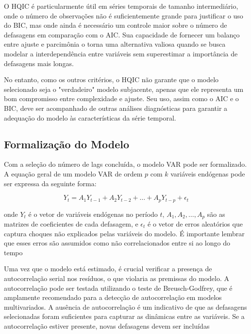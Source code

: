 \documentclass[12pt,oneside,a4paper,chapter=TITLE,english,brazil,sumario=abnt-6027-2012]{abntex2}
\begin{document}
O HQIC é particularmente útil em séries temporais de tamanho intermediário, onde o número de observações não é suficientemente grande para justificar o uso do BIC, mas onde ainda é necessário um controle maior sobre o número de defasagens em comparação com o AIC. Sua capacidade de fornecer um balanço entre ajuste e parcimônia o torna uma alternativa valiosa quando se busca modelar a interdependência entre variáveis sem superestimar a importância de defasagens mais longas.

No entanto, como os outros critérios, o HQIC não garante que o modelo selecionado seja o "verdadeiro" modelo subjacente, apenas que ele representa um bom compromisso entre complexidade e ajuste. Seu uso, assim como o AIC e o BIC, deve ser acompanhado de outras análises diagnósticas para garantir a adequação do modelo às características da série temporal.



\subsection{Formalização do Modelo}

Com a seleção do número de lags concluída, o modelo VAR pode ser formalizado. A equação geral de um modelo VAR de ordem \( p \) com \( k \) variáveis endógenas pode ser expressa da seguinte forma:

\[
	Y_t = A_1 Y_{t-1} + A_2 Y_{t-2} + \dots + A_p Y_{t-p} + \epsilon_t
\]

onde \( Y_t \) é o vetor de variáveis endógenas no período \( t \), \( A_1, A_2, \dots, A_p \) são as matrizes de coeficientes de cada defasagem, e \( \epsilon_t \) é o vetor de erros aleatórios que captura choques não explicados pelas variáveis do modelo. É importante lembrar que esses erros são assumidos como não correlacionados entre si ao longo do tempo %


Uma vez que o modelo está estimado, é crucial verificar a presença de autocorrelação serial nos resíduos, o que violaria as premissas do modelo. A autocorrelação pode ser testada utilizando o teste de Breusch-Godfrey, que é amplamente recomendado para a detecção de autocorrelação em modelos multivariados. A ausência de autocorrelação é um indicativo de que as defasagens selecionadas foram suficientes para capturar as dinâmicas entre as variáveis. Se a autocorrelação estiver presente, novas defasagens devem ser incluídas %
\end{document}
